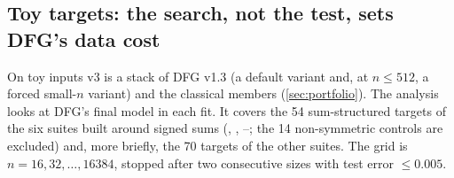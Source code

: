 \subsection{Toy targets: the search, not the test, sets DFG's data cost}\label{sec:interp-toy}

On toy inputs v3 is a stack of DFG v1.3 (a default variant and, at $n\le512$, a forced small-$n$ variant) and the classical members (\cref{sec:portfolio}). The analysis looks at DFG's final model in each fit. It covers the 54 sum-structured targets of the six suites built around signed sums (, , --; the 14 non-symmetric controls are excluded) and, more briefly, the 70 targets of the other suites. The grid is $n=16,32,\dots,16384$, stopped after two consecutive sizes with test error $\le0.005$.

